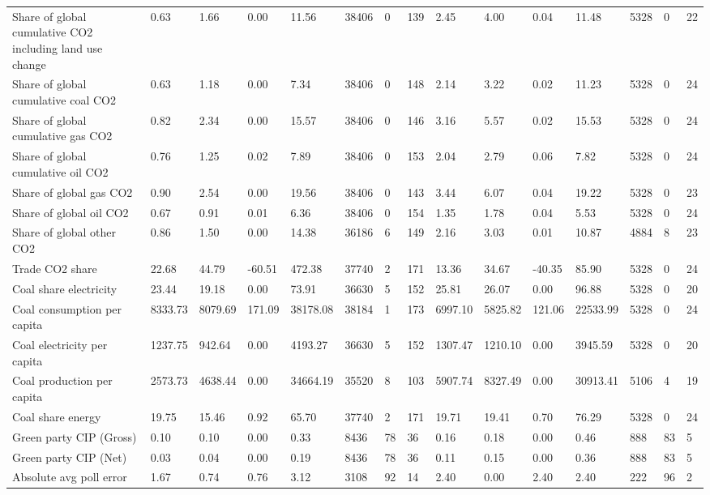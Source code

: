 \begin{longtable}{lllllllllllllll}
Share of global cumulative CO2 including land use change & 0.63 & 1.66 & 0.00 & 11.56 & 38406 & 0 & 139 & 2.45 & 4.00 & 0.04 & 11.48 & 5328 & 0 & 22\\
Share of global cumulative coal CO2 & 0.63 & 1.18 & 0.00 & 7.34 & 38406 & 0 & 148 & 2.14 & 3.22 & 0.02 & 11.23 & 5328 & 0 & 24\\
Share of global cumulative gas CO2 & 0.82 & 2.34 & 0.00 & 15.57 & 38406 & 0 & 146 & 3.16 & 5.57 & 0.02 & 15.53 & 5328 & 0 & 24\\
\addlinespace
Share of global cumulative oil CO2 & 0.76 & 1.25 & 0.02 & 7.89 & 38406 & 0 & 153 & 2.04 & 2.79 & 0.06 & 7.82 & 5328 & 0 & 24\\
Share of global gas CO2 & 0.90 & 2.54 & 0.00 & 19.56 & 38406 & 0 & 143 & 3.44 & 6.07 & 0.04 & 19.22 & 5328 & 0 & 23\\
Share of global oil CO2 & 0.67 & 0.91 & 0.01 & 6.36 & 38406 & 0 & 154 & 1.35 & 1.78 & 0.04 & 5.53 & 5328 & 0 & 24\\
Share of global other CO2 & 0.86 & 1.50 & 0.00 & 14.38 & 36186 & 6 & 149 & 2.16 & 3.03 & 0.01 & 10.87 & 4884 & 8 & 23\\
Trade CO2 share & 22.68 & 44.79 & -60.51 & 472.38 & 37740 & 2 & 171 & 13.36 & 34.67 & -40.35 & 85.90 & 5328 & 0 & 24\\
\addlinespace
Coal share electricity & 23.44 & 19.18 & 0.00 & 73.91 & 36630 & 5 & 152 & 25.81 & 26.07 & 0.00 & 96.88 & 5328 & 0 & 20\\
Coal consumption per capita & 8333.73 & 8079.69 & 171.09 & 38178.08 & 38184 & 1 & 173 & 6997.10 & 5825.82 & 121.06 & 22533.99 & 5328 & 0 & 24\\
Coal electricity per capita & 1237.75 & 942.64 & 0.00 & 4193.27 & 36630 & 5 & 152 & 1307.47 & 1210.10 & 0.00 & 3945.59 & 5328 & 0 & 20\\
Coal production per capita & 2573.73 & 4638.44 & 0.00 & 34664.19 & 35520 & 8 & 103 & 5907.74 & 8327.49 & 0.00 & 30913.41 & 5106 & 4 & 19\\
Coal share energy & 19.75 & 15.46 & 0.92 & 65.70 & 37740 & 2 & 171 & 19.71 & 19.41 & 0.70 & 76.29 & 5328 & 0 & 24\\
\addlinespace
Green party CIP (Gross) & 0.10 & 0.10 & 0.00 & 0.33 & 8436 & 78 & 36 & 0.16 & 0.18 & 0.00 & 0.46 & 888 & 83 & 5\\
Green party CIP (Net) & 0.03 & 0.04 & 0.00 & 0.19 & 8436 & 78 & 36 & 0.11 & 0.15 & 0.00 & 0.36 & 888 & 83 & 5\\
Absolute avg poll error & 1.67 & 0.74 & 0.76 & 3.12 & 3108 & 92 & 14 & 2.40 & 0.00 & 2.40 & 2.40 & 222 & 96 & 2\\

\end{longtable}
